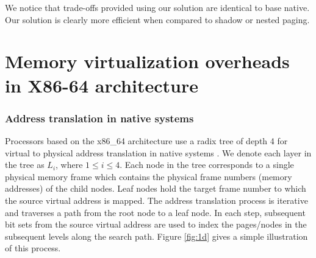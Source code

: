 \documentclass[sigconf]{sigplanconf}
\begin{document}
  	\begin{table}[!h]
  		\centering
  		\caption{Trade-offs provided by our solution}
  		\label{tab:comparison}
  	\end{table}
  	
  	We notice that trade-offs provided using our solution are identical to base native. Our solution is clearly more efficient when compared to shadow or nested paging. 
  	
  	
  	
     \section{Memory virtualization overheads in X86-64 architecture}
     \subsubsection{Address translation in native systems}
     Processors based on the x86\_64 architecture use a radix tree of depth 4 for virtual to physical address translation in native systems \cite{dvmt}. We denote each layer in the tree as $L_i$, where $1 \leq i \leq 4$. Each node in the tree corresponds to a single physical memory frame which contains the physical frame numbers (memory addresses) of the child nodes. Leaf nodes hold the target frame number to which the source virtual address is mapped.     
     The address translation process is iterative and traverses a path from the root node to a leaf node. In each step, subsequent bit sets from the source virtual address are used to index the pages/nodes in the subsequent levels along the search path. Figure \ref{fig:1d} gives a simple illustration of this process. 
     
\end{document}
